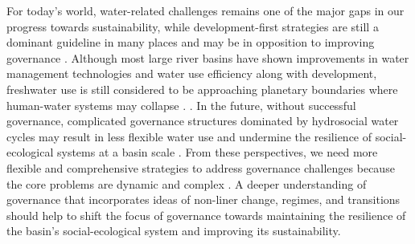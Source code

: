 For today's world, water-related challenges remains one of the major gaps in our progress towards sustainability, while development-first strategies are still a dominant guideline in many places and may be in opposition to improving governance
\cite{xuAssessingprogresssustainable2020,liuAerosolweakenedsummermonsoons2017,greveGlobalassessmentwater2018}.
Although most large river basins have shown improvements in water management technologies and water use efficiency along with development, freshwater use is still considered to be approaching planetary boundaries where human-water systems may collapse
\cite{anExploringeffectsGrain2017,degraafEnvironmentalflowlimits2019,hugginssocialecologicaldimensionschanging2020}.
\cite{graftonparadoxirrigationefficiency2018}.
In the future, without successful governance, complicated governance structures dominated by hydrosocial water cycles may result in less flexible water use and undermine the resilience of social-ecological systems at a basin scale
\cite{qinFlexibilityintensityglobal2019,leviaHomogenizationterrestrialwater2020,grillMappingworldfreeflowing2019}.
From these perspectives, we need more flexible and comprehensive strategies to address governance challenges because the core problems are dynamic and complex
\cite{steffenemergenceevolutionEarth2020,muneepeerakulemergenceresilienceselforganized2020,bodinCollaborativeenvironmentalgovernance2017,biermannNavigatingAnthropoceneImproving2012}.
A deeper understanding of governance that incorporates ideas of non-liner change, regimes, and transitions should help to shift the focus of governance towards maintaining the resilience of the basin’s social-ecological system and improving its sustainability.
